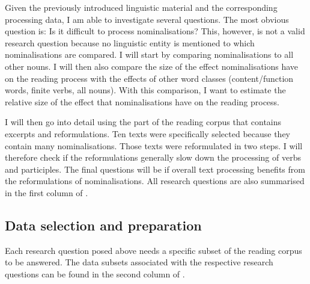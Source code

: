 \documentclass[output=paper]{langsci/langscibook}
\begin{document}
Given the previously introduced linguistic material and the corresponding processing data, I am able to investigate several questions. The most obvious question is: Is it difficult to process nominalisations? This, however, is not a valid research question because no linguistic entity is mentioned to which nominalisations are compared. I will start by comparing nominalisations to all other nouns. I will then also compare the size of the effect nominalisations have on the reading process with the effects of other word classes (content/function words, finite verbs, all nouns). With this comparison, I want to estimate the relative size of the effect that nominalisations have on the reading process.

\largerpage 
I will then go into detail using the part of the reading corpus that contains excerpts and reformulations. Ten texts were specifically selected because they contain many nominalisations. Those texts were reformulated in two steps. I will therefore check if the reformulations generally slow down the processing of verbs and participles. The final questions will be if overall text processing benefits from the reformulations of nominalisations. All research questions are also summarised in the first column of .

\subsection{\label{wolfer:sec:3.1}Data selection and preparation}

Each research question posed above needs a specific subset of the reading corpus to be answered. The data subsets associated with the respective research questions can be found in the second column of .
\end{document}
